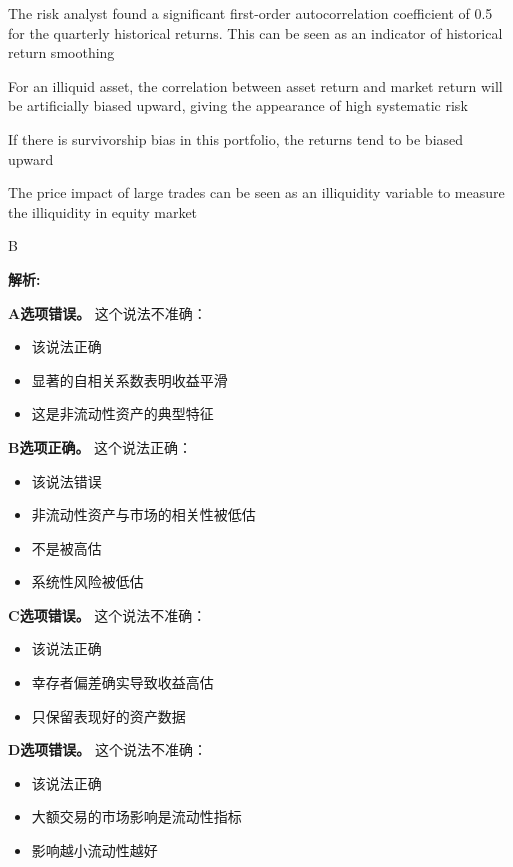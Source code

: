 \documentclass{article}
\newenvironment{explanation}
{\textbf{解析:}\par}
{\par}
\begin{document}
\begin{choices}
    \item The risk analyst found a significant first-order autocorrelation coefficient of 0.5 for the quarterly historical returns. This can be seen as an indicator of historical return smoothing
    \item For an illiquid asset, the correlation between asset return and market return will be artificially biased upward, giving the appearance of high systematic risk
    \item If there is survivorship bias in this portfolio, the returns tend to be biased upward
    \item The price impact of large trades can be seen as an illiquidity variable to measure the illiquidity in equity market
\end{choices}

\begin{correctanswer}
    B
\end{correctanswer}

\begin{explanation}
    \textbf{A选项错误。}
    这个说法不准确：
    \begin{itemize}
        \item 该说法正确
        \item 显著的自相关系数表明收益平滑
        \item 这是非流动性资产的典型特征
    \end{itemize}

    \textbf{B选项正确。}
    这个说法正确：
    \begin{itemize}
        \item 该说法错误
        \item 非流动性资产与市场的相关性被低估
        \item 不是被高估
        \item 系统性风险被低估
    \end{itemize}

    \textbf{C选项错误。}
    这个说法不准确：
    \begin{itemize}
        \item 该说法正确
        \item 幸存者偏差确实导致收益高估
        \item 只保留表现好的资产数据
    \end{itemize}

    \textbf{D选项错误。}
    这个说法不准确：
    \begin{itemize}
        \item 该说法正确
        \item 大额交易的市场影响是流动性指标
        \item 影响越小流动性越好
    \end{itemize}
\end{explanation}
\end{document}
